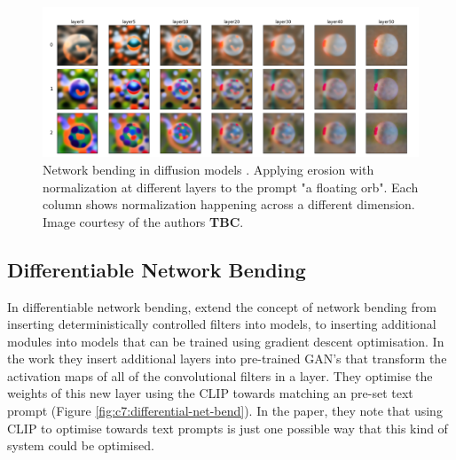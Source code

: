 \begin{figure}[!htb]
    \centering
    \captionsetup{justification=centering}
    \includegraphics[width=1\textwidth]{figures/c7_impact/net-bend-technical/net-bend-diffusion.png}
    \caption[Network bending in diffusion models]{Network bending in diffusion models \citep{dzwonczyk2024network}. Applying erosion with normalization at different layers to the prompt "a floating orb". Each column shows normalization happening across a different dimension. Image courtesy of the authors \textbf{TBC}.}
    \label{fig:c7:net-bend-diffusion}
\end{figure}

\subsection{Differentiable Network Bending}

In differentiable network bending, \cite{aldegheri2023hacking} extend the concept of network bending from inserting deterministically controlled filters into models, to inserting additional modules into models that can be trained using gradient descent optimisation.
In the work they insert additional layers into pre-trained GAN's that transform the activation maps of all of the convolutional filters in a layer.
They optimise the weights of this new layer using the CLIP \citep{radford2021learning} towards matching an pre-set text prompt (Figure \ref{fig:c7:differential-net-bend}).
In the paper, they note that using CLIP to optimise towards text prompts is just one possible way that this kind of system could be optimised. 

